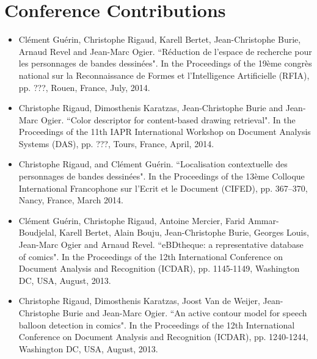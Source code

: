 \section*{Conference Contributions}

\begin{itemize}

\item Cl{\'e}ment Gu{\'e}rin, Christophe Rigaud, Karell Bertet, Jean-Christophe Burie, Arnaud Revel and Jean-Marc Ogier. ``R{\'e}duction de l'espace de recherche pour les personnages de bandes dessin{\'e}es". In the Proceedings of the 19{\`e}me congr{\`e}s national sur la Reconnaissance de Formes et l'Intelligence Artificielle (RFIA), pp. ???, Rouen, France, July, 2014.
\vspace*{.3cm}

\item Christophe Rigaud, Dimosthenis Karatzas, Jean-Christophe Burie and Jean-Marc Ogier. ``Color descriptor for content-based drawing retrieval". In the Proceedings of the 11th IAPR International Workshop on Document Analysis Systems (DAS), pp. ???, Tours, France, April, 2014.
\vspace*{.3cm}

\item Christophe Rigaud, and Cl{\'e}ment Gu{\'e}rin. ``Localisation contextuelle des personnages de bandes dessinées". In the Proceedings of the 13{\`e}me Colloque International Francophone sur l'Ecrit et le Document (CIFED), pp. 367–370, Nancy, France, March 2014.
\vspace*{.3cm}

\item Cl{\'e}ment Gu{\'e}rin, Christophe Rigaud, Antoine Mercier, Farid Ammar-Boudjelal, Karell Bertet, Alain Bouju, Jean-Christophe Burie, Georges Louis, Jean-Marc Ogier and Arnaud Revel. ``eBDtheque: a representative database of comics". In the Proceedings of the 12th International Conference on Document Analysis and Recognition (ICDAR), pp. 1145-1149, Washington DC, USA, August, 2013.
\vspace*{.3cm}

\item Christophe Rigaud, Dimosthenis Karatzas, Joost Van de Weijer, Jean-Christophe Burie and Jean-Marc Ogier. ``An active contour model for speech balloon detection in comics". In the Proceedings of the 12th International Conference on Document Analysis and Recognition (ICDAR), pp. 1240-1244, Washington DC, USA, August, 2013.
\vspace*{.3cm}


\end{itemize}
